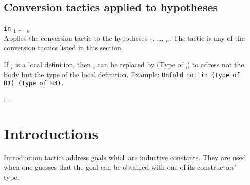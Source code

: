 
\subsection{Conversion tactics applied to hypotheses}

{\convtactic} {\tt in} \ident$_1$ \dots\ \ident$_n$ \\
Applies the conversion tactic {\convtactic} to the
hypotheses \ident$_1$, \ldots, \ident$_n$. The tactic {\convtactic} is
any of the conversion tactics listed in this section. 

If \ident$_i$ is a local definition, then \ident$_i$ can be replaced
by (Type of \ident$_i$) to adress not the body but the type of the
local definition. Example: {\tt Unfold not in (Type of H1) (Type of H3).}

\begin{ErrMsgs}
\item {} : {\ident}.
\end{ErrMsgs}


\section{Introductions}
Introduction tactics address goals which are inductive constants.
They are used when one guesses that the goal can be obtained with one
of its constructors' type.

